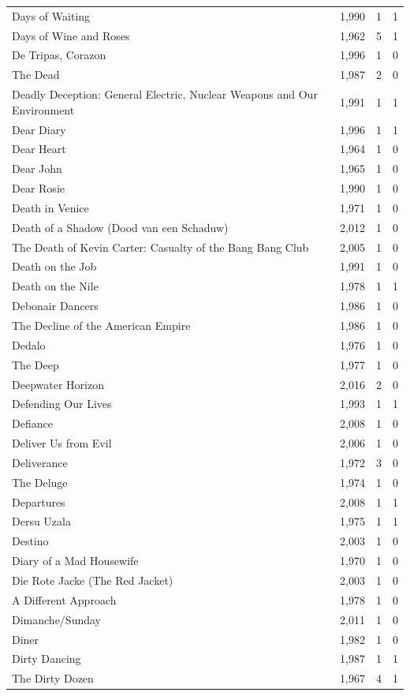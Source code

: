 \begin{tabular}{lrrr}
Days of Waiting & 1,990 & 1 & 1 \\
Days of Wine and Roses & 1,962 & 5 & 1 \\
De Tripas, Corazon & 1,996 & 1 & 0 \\
The Dead & 1,987 & 2 & 0 \\
Deadly Deception: General Electric, Nuclear Weapons and Our Environment & 1,991 & 1 & 1 \\
Dear Diary & 1,996 & 1 & 1 \\
Dear Heart & 1,964 & 1 & 0 \\
Dear John & 1,965 & 1 & 0 \\
Dear Rosie & 1,990 & 1 & 0 \\
Death in Venice & 1,971 & 1 & 0 \\
Death of a Shadow (Dood van een Schaduw) & 2,012 & 1 & 0 \\
The Death of Kevin Carter: Casualty of the Bang Bang Club & 2,005 & 1 & 0 \\
Death on the Job & 1,991 & 1 & 0 \\
Death on the Nile & 1,978 & 1 & 1 \\
Debonair Dancers & 1,986 & 1 & 0 \\
The Decline of the American Empire & 1,986 & 1 & 0 \\
Dedalo & 1,976 & 1 & 0 \\
The Deep & 1,977 & 1 & 0 \\
Deepwater Horizon & 2,016 & 2 & 0 \\
Defending Our Lives & 1,993 & 1 & 1 \\
Defiance & 2,008 & 1 & 0 \\
Deliver Us from Evil & 2,006 & 1 & 0 \\
Deliverance & 1,972 & 3 & 0 \\
The Deluge & 1,974 & 1 & 0 \\
Departures & 2,008 & 1 & 1 \\
Dersu Uzala & 1,975 & 1 & 1 \\
Destino & 2,003 & 1 & 0 \\
Diary of a Mad Housewife & 1,970 & 1 & 0 \\
Die Rote Jacke (The Red Jacket) & 2,003 & 1 & 0 \\
A Different Approach & 1,978 & 1 & 0 \\
Dimanche/Sunday & 2,011 & 1 & 0 \\
Diner & 1,982 & 1 & 0 \\
Dirty Dancing & 1,987 & 1 & 1 \\
The Dirty Dozen & 1,967 & 4 & 1 \\

\end{tabular}
